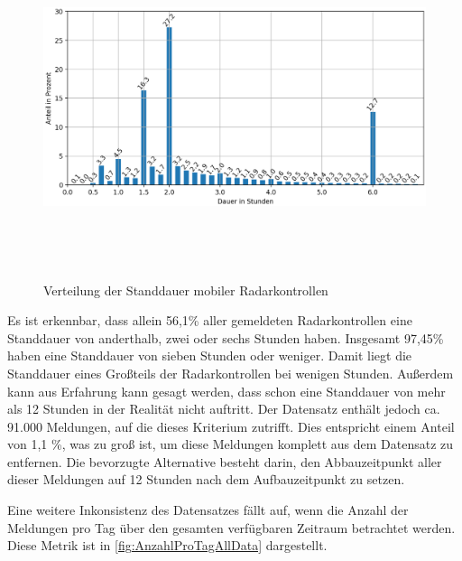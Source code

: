 \begin{figure}[h]
    \centering
    \includegraphics[width=1.0\textwidth,height=10cm,keepaspectratio=true]{content/images/Standdauer.png}
    \caption{Verteilung der Standdauer mobiler Radarkontrollen}
    \label{fig:StanddauerVerteilung}
\end{figure}

Es ist erkennbar, dass allein 56,1\% aller gemeldeten Radarkontrollen eine Standdauer von anderthalb, zwei oder sechs Stunden haben.
Insgesamt 97,45\% haben eine Standdauer von sieben Stunden oder weniger.
Damit liegt die Standdauer eines Großteils der Radarkontrollen bei wenigen Stunden.
Außerdem kann aus Erfahrung kann gesagt werden, dass schon eine Standdauer von mehr als 12 Stunden in der Realität nicht auftritt.
Der Datensatz enthält jedoch ca. 91.000 Meldungen, auf die dieses Kriterium zutrifft.
Dies entspricht einem Anteil von 1,1 \%, was zu groß ist, um diese Meldungen komplett aus dem Datensatz zu entfernen.
Die bevorzugte Alternative besteht darin, den Abbauzeitpunkt aller dieser Meldungen auf 12 Stunden nach dem Aufbauzeitpunkt zu setzen.

Eine weitere Inkonsistenz des Datensatzes fällt auf, wenn die Anzahl der Meldungen pro Tag über den gesamten verfügbaren Zeitraum betrachtet werden.
Diese Metrik ist in \autoref{fig:AnzahlProTagAllData} dargestellt.

